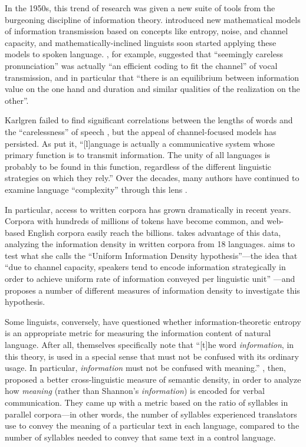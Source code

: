 \documentclass[12pt,twoside]{article}
\begin{document}
In the 1950s, this trend of research was given a new suite of tools from the burgeoning discipline of information theory. \citet{shannon} introduced new mathematical models of information transmission based on concepts like entropy, noise, and channel capacity, and mathematically-inclined linguists soon started applying these models to spoken language. \citet[674,676]{karlgren}, for example, suggested that ``seemingly careless pronunciation'' was actually ``an efficient coding to fit the channel'' of vocal transmission, and in particular that ``there is an equilibrium between information value on the one hand and duration and similar qualities of the realization on the other''.

Karlgren failed to find significant correlations between the lengths of words and the ``carelessness'' of speech \citep{karlgren}, but the appeal of channel-focused models has persisted. As \citet[539]{pellegrino} put it, ``[l]anguage is actually a communicative system whose primary function is to transmit information. The unity of all languages is probably to be found in this function, regardless of the different linguistic strategies on which they rely.'' Over the decades, many authors have continued to examine language ``complexity'' through this lens \citep{pellegrino,oh,coupé}.

In particular, access to written corpora has grown dramatically in recent years. Corpora with hundreds of millions of tokens have become common, and web-based English corpora easily reach the billions. \citet{oh} takes advantage of this data, analyzing the information density in written corpora from 18 languages. \citeauthor{oh} aims to test what she calls the ``Uniform Information Density hypothesis''---the idea that ``due to channel capacity, speakers tend to encode information strategically in order to achieve uniform rate of information conveyed per linguistic unit'' \citep[v]{oh}---and proposes a number of different measures of information density to investigate this hypothesis.

Some linguists, conversely, have questioned whether information-theoretic entropy is an appropriate metric for measuring the information content of natural language. After all, \citet[8]{shannon} themselves specifically note that ``[t]he word \emph{information}, in this theory, is used in a special sense that must not be confused with its ordinary usage. In particular, \emph{information} must not be confused with meaning.'' \citet{pellegrino}, then, proposed a better cross-linguistic measure of semantic density, in order to analyze how \emph{meaning} (rather than Shannon's \emph{information}) is encoded for verbal communication. They came up with a metric based on the ratio of syllables in parallel corpora---in other words, the number of syllables experienced translators use to convey the meaning of a particular text in each language, compared to the number of syllables needed to convey that same text in a control language.
\end{document}
